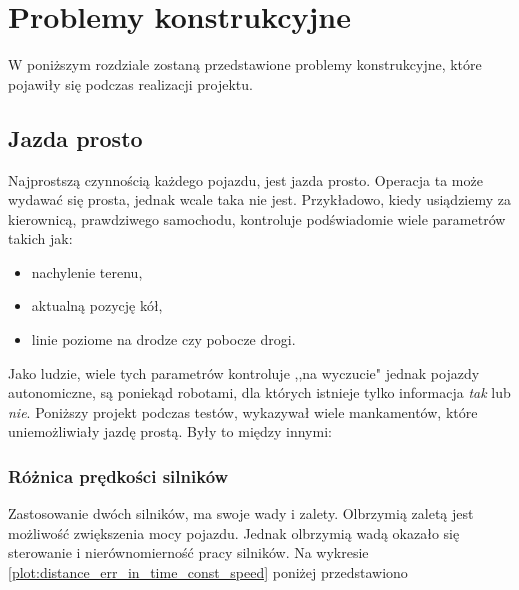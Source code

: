 \section{Problemy konstrukcyjne}
\label{sec:problemy_konstrukcyjne}
    W poniższym rozdziale zostaną przedstawione problemy konstrukcyjne,
    które pojawiły się podczas realizacji projektu.

    \subsection{Jazda prosto}
        Najprostszą czynnością każdego pojazdu, jest jazda prosto.
        Operacja ta może wydawać się prosta, jednak wcale taka nie jest.
        Przykładowo, kiedy usiądziemy za kierownicą, prawdziwego samochodu, kontroluje podświadomie wiele parametrów takich jak:
        \begin{itemize}
            \item nachylenie terenu,
            \item aktualną pozycję kół,
            \item linie poziome na drodze czy pobocze drogi.
        \end{itemize}
        Jako ludzie, wiele tych parametrów kontroluje ,,na wyczucie" jednak pojazdy autonomiczne, są poniekąd robotami, dla których istnieje tylko informacja \textit{tak} lub \textit{nie}.
        Poniższy projekt podczas testów, wykazywał wiele mankamentów, które uniemożliwiały jazdę prostą.
        Były to między innymi:
        
        \subsubsection{Różnica prędkości silników}
            Zastosowanie dwóch silników, ma swoje wady i zalety.
            Olbrzymią zaletą jest możliwość zwiększenia mocy pojazdu.
            Jednak olbrzymią wadą okazało się sterowanie i nierównomierność pracy silników.
            Na wykresie \ref{plot:distance_err_in_time_const_speed} poniżej przedstawiono 

